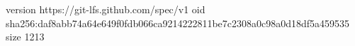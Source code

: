 version https://git-lfs.github.com/spec/v1
oid sha256:daf8abb74a64e649f0fdb066ca9214222811be7c2308a0c98a0d18df5a459535
size 1213

